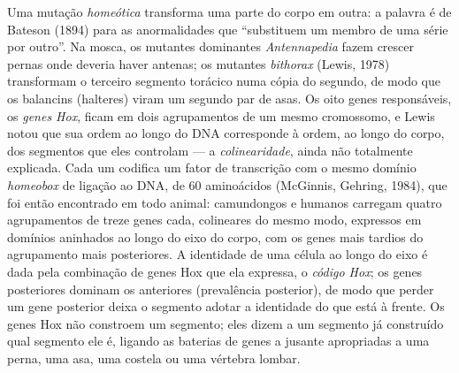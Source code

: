 \begin{definition}\label{def:b3:developmental-genetics:hox}
Uma mutação \emph{homeótica} transforma uma parte do corpo em outra: a
palavra é de Bateson (1894) para as anormalidades que ``substituem um
membro de uma série por outro''. Na mosca, os mutantes dominantes
\emph{Antennapedia} fazem crescer pernas onde deveria haver antenas; os
mutantes \emph{bithorax} (Lewis, 1978) transformam o terceiro segmento
torácico numa cópia do segundo, de modo que os balancins (halteres)
viram um segundo par de asas. Os oito genes responsáveis, os \emph{genes
Hox}, ficam em dois agrupamentos de um mesmo cromossomo, e Lewis notou
que sua ordem ao longo do DNA corresponde à ordem, ao longo do corpo,
dos segmentos que eles controlam --- a \emph{colinearidade}, ainda não
totalmente explicada. Cada um codifica um fator de transcrição com o
mesmo domínio \emph{homeobox} de ligação ao DNA, de 60 aminoácidos
(McGinnis, Gehring, 1984), que foi então encontrado em todo animal:
camundongos e humanos carregam quatro agrupamentos de treze genes cada,
colineares do mesmo modo, expressos em domínios aninhados ao longo do
eixo do corpo, com os genes mais tardios do agrupamento mais
posteriores. A identidade de uma célula ao longo do eixo é dada pela
combinação de genes Hox que ela expressa, o \emph{código Hox}; os genes
posteriores dominam os anteriores (prevalência posterior), de modo que
perder um gene posterior deixa o segmento adotar a identidade do que
está à frente. Os genes Hox não constroem um segmento; eles dizem a um
segmento já construído qual segmento ele é, ligando as baterias de genes
a jusante apropriadas a uma perna, uma asa, uma costela ou uma vértebra
lombar.
\end{definition}

